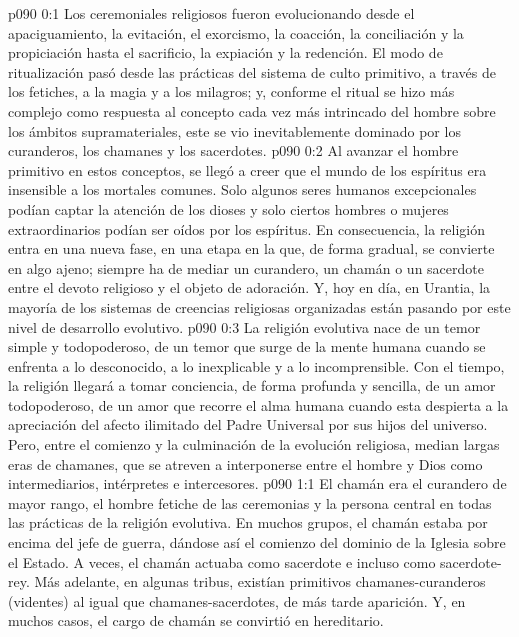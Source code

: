 \author{Melquisedec}
\vs p090 0:1 Los ceremoniales religiosos fueron evolucionando desde el apaciguamiento, la evitación, el exorcismo, la coacción, la conciliación y la propiciación hasta el sacrificio, la expiación y la redención. El modo de ritualización pasó desde las prácticas del sistema de culto primitivo, a través de los fetiches, a la magia y a los milagros; y, conforme el ritual se hizo más complejo como respuesta al concepto cada vez más intrincado del hombre sobre los ámbitos supramateriales, este se vio inevitablemente dominado por los curanderos, los chamanes y los sacerdotes.
\vs p090 0:2 Al avanzar el hombre primitivo en estos conceptos, se llegó a creer que el mundo de los espíritus era insensible a los mortales comunes. Solo algunos seres humanos excepcionales podían captar la atención de los dioses y solo ciertos hombres o mujeres extraordinarios podían ser oídos por los espíritus. En consecuencia, la religión entra en una nueva fase, en una etapa en la que, de forma gradual, se convierte en algo ajeno; siempre ha de mediar un curandero, un chamán o un sacerdote entre el devoto religioso y el objeto de adoración. Y, hoy en día, en Urantia, la mayoría de los sistemas de creencias religiosas organizadas están pasando por este nivel de desarrollo evolutivo.
\vs p090 0:3 La religión evolutiva nace de un temor simple y todopoderoso, de un temor que surge de la mente humana cuando se enfrenta a lo desconocido, a lo inexplicable y a lo incomprensible. Con el tiempo, la religión llegará a tomar conciencia, de forma profunda y sencilla, de un amor todopoderoso, de un amor que recorre el alma humana cuando esta despierta a la apreciación del afecto ilimitado del Padre Universal por sus hijos del universo. Pero, entre el comienzo y la culminación de la evolución religiosa, median largas eras de chamanes, que se atreven a interponerse entre el hombre y Dios como intermediarios, intérpretes e intercesores.
\vs p090 1:1 El chamán era el curandero de mayor rango, el hombre fetiche de las ceremonias y la persona central en todas las prácticas de la religión evolutiva. En muchos grupos, el chamán estaba por encima del jefe de guerra, dándose así el comienzo del dominio de la Iglesia sobre el Estado. A veces, el chamán actuaba como sacerdote e incluso como sacerdote\hyp{}rey. Más adelante, en algunas tribus, existían primitivos chamanes\hyp{}curanderos (videntes) al igual que chamanes\hyp{}sacerdotes, de más tarde aparición. Y, en muchos casos, el cargo de chamán se convirtió en hereditario.

